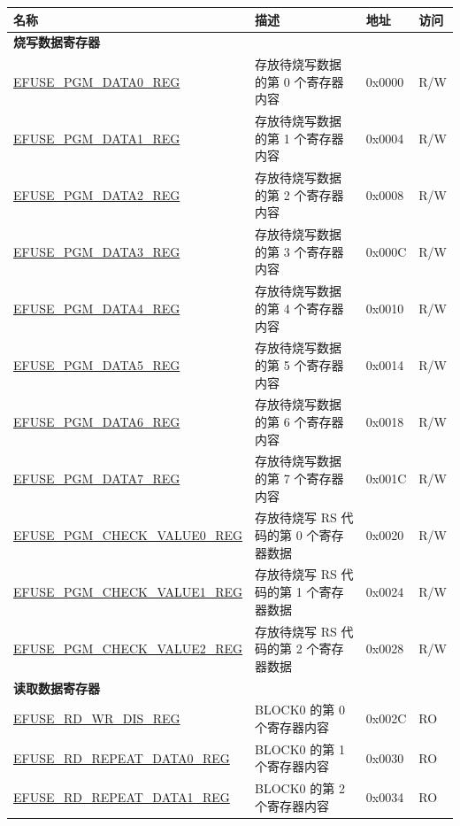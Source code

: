 \begin{longtable}{ | p{5.8cm} | p{7cm} | p{1.3cm} | p{1.2cm} | }
\hline\rowcolor{lightgray}
名称 & 描述 &  地址 & 访问 \\ \hline
\endhead
\multicolumn{4}{|l|}{\textbf{烧写数据寄存器}} \\ \hline
\hyperref[regdesc:EFUSEPGMDATA0REG]{EFUSE\_PGM\_DATA0\_REG} & 存放待烧写数据的第 0 个寄存器内容 & 0x0000 & R/W \\ \hline
\hyperref[regdesc:EFUSEPGMDATA1REG]{EFUSE\_PGM\_DATA1\_REG} & 存放待烧写数据的第 1 个寄存器内容 & 0x0004 & R/W \\ \hline
\hyperref[regdesc:EFUSEPGMDATA2REG]{EFUSE\_PGM\_DATA2\_REG} & 存放待烧写数据的第 2 个寄存器内容 & 0x0008 & R/W \\ \hline
\hyperref[regdesc:EFUSEPGMDATA3REG]{EFUSE\_PGM\_DATA3\_REG} & 存放待烧写数据的第 3 个寄存器内容 & 0x000C & R/W \\ \hline
\hyperref[regdesc:EFUSEPGMDATA4REG]{EFUSE\_PGM\_DATA4\_REG} & 存放待烧写数据的第 4 个寄存器内容 & 0x0010 & R/W \\ \hline
\hyperref[regdesc:EFUSEPGMDATA5REG]{EFUSE\_PGM\_DATA5\_REG} & 存放待烧写数据的第 5 个寄存器内容 & 0x0014 & R/W \\ \hline
\hyperref[regdesc:EFUSEPGMDATA6REG]{EFUSE\_PGM\_DATA6\_REG} & 存放待烧写数据的第 6 个寄存器内容 & 0x0018 & R/W \\ \hline
\hyperref[regdesc:EFUSEPGMDATA7REG]{EFUSE\_PGM\_DATA7\_REG} & 存放待烧写数据的第 7 个寄存器内容 & 0x001C & R/W \\ \hline
\hyperref[regdesc:EFUSEPGMCHECKVALUE0REG]{EFUSE\_PGM\_CHECK\_VALUE0\_REG} & 存放待烧写 RS 代码的第 0 个寄存器数据 & 0x0020 & R/W \\ \hline
\hyperref[regdesc:EFUSEPGMCHECKVALUE1REG]{EFUSE\_PGM\_CHECK\_VALUE1\_REG} & 存放待烧写 RS 代码的第 1 个寄存器数据 & 0x0024 & R/W \\ \hline
\hyperref[regdesc:EFUSEPGMCHECKVALUE2REG]{EFUSE\_PGM\_CHECK\_VALUE2\_REG} & 存放待烧写 RS 代码的第 2 个寄存器数据 & 0x0028 & R/W \\ \hline
\multicolumn{4}{|l|}{\textbf{读取数据寄存器}} \\ \hline
\hyperref[regdesc:EFUSERDWRDISREG]{EFUSE\_RD\_WR\_DIS\_REG} & BLOCK0 的第 0 个寄存器内容 & 0x002C & RO \\ \hline
\hyperref[regdesc:EFUSERDREPEATDATA0REG]{EFUSE\_RD\_REPEAT\_DATA0\_REG} & BLOCK0 的第 1 个寄存器内容 & 0x0030 & RO \\ \hline
\hyperref[regdesc:EFUSERDREPEATDATA1REG]{EFUSE\_RD\_REPEAT\_DATA1\_REG} & BLOCK0 的第 2 个寄存器内容 & 0x0034 & RO \\ \hline

\end{longtable}
